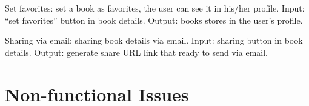 \documentclass[titlepage]{article}
\begin{document}
	
	Set favorites: set a book as favorites, the user can see it in his/her profile. Input: “set favorites” button in book details. Output: books stores in the user’s profile.
	
	
	Sharing via email: sharing book details via email. Input: sharing button in book details. Output: generate share URL link that ready to send via email. 





	\section{Non-functional Issues}
\end{document}
